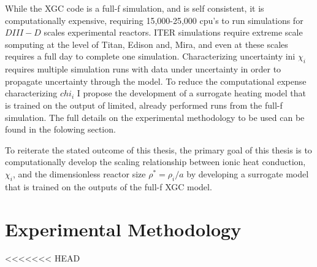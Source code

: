 \documentclass{article}
\begin{document}
While the XGC code is a full-f simulation, and is self consistent, it is computationally expensive, requiring 15,000-25,000 cpu's to run simulations for $DIII-D$ scales experimental reactors. ITER simulations require extreme scale somputing at the level of Titan, Edison and, Mira, and even at these scales requires a full day to complete one simulation. Characterizing uncertainty ini $\chi_i$  requires multiple simulation runs with data under uncertainty in order to propagate uncertainty through the model. To reduce the computational expense characterizing $chi_i$ I propose the development of a surrogate heating model that is trained on the output of limited, already performed runs from the full-f simulation. The full details on the experimental methodology to be used can be found in the folowing section.

To reiterate the stated outcome of this thesis, the primary goal of this thesis is to computationally develop the scaling relationship between ionic heat conduction, $\chi_i$, and the dimensionless reactor size $\rho^* = \rho_i/a$ by developing a surrogate model that is trained on the outputs of the full-f XGC model.






\section{Experimental Methodology}


<<<<<<< HEAD
%
\end{document}
